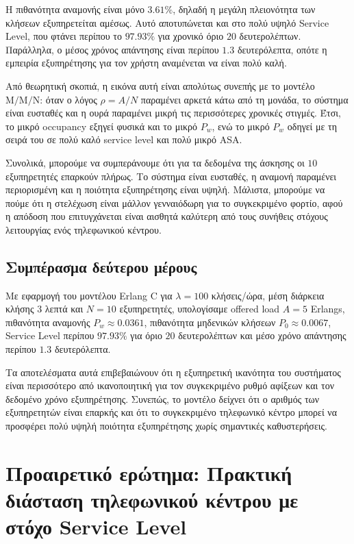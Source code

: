 \documentclass{article}
\begin{document}
Η πιθανότητα αναμονής είναι μόνο $3.61\%$, δηλαδή η μεγάλη πλειονότητα των κλήσεων εξυπηρετείται αμέσως. Αυτό αποτυπώνεται και στο πολύ υψηλό \foreignlanguage{english}{Service Level}, που φτάνει περίπου το $97.93\%$ για χρονικό όριο $20$ δευτερολέπτων. Παράλληλα, ο μέσος χρόνος απάντησης είναι περίπου $1.3$ δευτερόλεπτα, οπότε η εμπειρία εξυπηρέτησης για τον χρήστη αναμένεται να είναι πολύ καλή.

Από θεωρητική σκοπιά, η εικόνα αυτή είναι απολύτως συνεπής με το μοντέλο $\mathrm{M/M/N}$: όταν ο λόγος $\rho = A/N$ παραμένει αρκετά κάτω από τη μονάδα, το σύστημα είναι ευσταθές και η ουρά παραμένει μικρή τις περισσότερες χρονικές στιγμές. Έτσι, το μικρό occupancy εξηγεί φυσικά και το μικρό $P_w$, ενώ το μικρό $P_w$ οδηγεί με τη σειρά του σε πολύ καλό service level και πολύ μικρό ASA.

Συνολικά, μπορούμε να συμπεράνουμε ότι για τα δεδομένα της άσκησης οι $10$ εξυπηρετητές επαρκούν πλήρως. Το σύστημα είναι ευσταθές, η αναμονή παραμένει περιορισμένη και η ποιότητα εξυπηρέτησης είναι υψηλή. Μάλιστα, μπορούμε να πούμε ότι η στελέχωση είναι μάλλον γενναιόδωρη για το συγκεκριμένο φορτίο, αφού η απόδοση που επιτυγχάνεται είναι αισθητά καλύτερη από τους συνήθεις στόχους λειτουργίας ενός τηλεφωνικού κέντρου.

\subsection{Συμπέρασμα δεύτερου μέρους}

Με εφαρμογή του μοντέλου Erlang C για $\lambda = 100$ κλήσεις/ώρα, μέση διάρκεια κλήσης $3$ λεπτά και $N = 10$ εξυπηρετητές, υπολογίσαμε offered load $A = 5$ Erlangs, πιθανότητα αναμονής $P_w \approx 0.0361$, πιθανότητα μηδενικών κλήσεων $P_0 \approx 0.0067$, \foreignlanguage{english}{Service Level} περίπου $97.93\%$ για όριο $20$ δευτερολέπτων και μέσο χρόνο απάντησης περίπου $1.3$ δευτερόλεπτα.

Τα αποτελέσματα αυτά επιβεβαιώνουν ότι η εξυπηρετική ικανότητα του συστήματος είναι περισσότερο από ικανοποιητική για τον συγκεκριμένο ρυθμό αφίξεων και τον δεδομένο χρόνο εξυπηρέτησης. Συνεπώς, το μοντέλο δείχνει ότι ο αριθμός των εξυπηρετητών είναι επαρκής και ότι το συγκεκριμένο τηλεφωνικό κέντρο μπορεί να προσφέρει πολύ υψηλή ποιότητα εξυπηρέτησης χωρίς σημαντικές καθυστερήσεις.

\newpage
\section{Προαιρετικό ερώτημα: Πρακτική διάσταση τηλεφωνικού κέντρου με στόχο Service Level}
\end{document}
